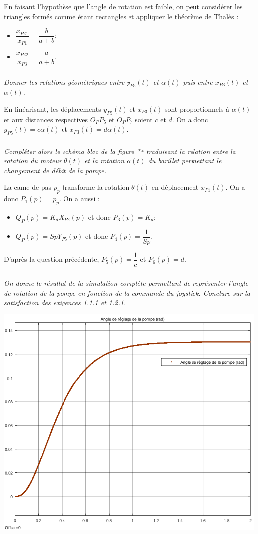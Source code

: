 \documentclass[10pt,fleqn]{article} %
\begin{document}
\begin{multicols}{2}
\begin{corrige}
En faisant l'hypothèse que l'angle de rotation est faible, on peut considérer les triangles formés comme étant rectangles et appliquer le théorème de Thalès :
\begin{itemize}
\item $\dfrac{x_{P21}}{x_{P1}}=\dfrac{b}{a+b}$;
\item $\dfrac{x_{P22}}{x_{P3}}=\dfrac{a}{a+b}$.
\end{itemize}
\end{corrige}
\else
\fi

\subparagraph{}
\textit{Donner les relations géométriques entre $y_{P5}(t)$ et $\alpha(t)$ puis entre $x_{P3}(t)$ et $\alpha(t)$.}
\ifprof
\begin{corrige}
En linéarisant, les déplacements $y_{P5}(t)$ et $x_{P3}(t)$ sont proportionnels à $\alpha(t)$ et aux distances respectives $O_PP_5$ et $O_PP_7$ soient $c$ et $d$. 
On a donc $y_{P5}(t)=c\alpha(t)$ et $x_{P3}(t)=d \alpha(t)$.

\end{corrige}
\else 
\fi
\subparagraph{}
\textit{Compléter alors le schéma bloc de la figure ** traduisant la relation entre la rotation du moteur $\theta(t)$ et la rotation $\alpha(t)$ du barillet permettant le changement de débit de la pompe.}
\ifprof


\begin{corrige}
La came de pas $p_p$ transforme la rotation $\theta(t)$ en déplacement $x_{P1}(t)$. 
On a donc $P_1(p)=p_p$.
On a aussi :
\begin{itemize}
\item $Q_P(p) = K_d X_{P2}(p)$ et donc $P_3(p)=K_d$;
\item $Q_{P}(p) = Sp Y_{P5}(p)$ et donc $P_4(p)=\dfrac{1}{Sp}$.
\end{itemize}
D'après la question précédente, $P_5(p)=\dfrac{1}{c}$ et $P_6(p)=d$.
\end{corrige}
\else
\fi

\subparagraph{}
\textit{On donne le résultat de la simulation complète permettant de représenter l'angle de rotation de la pompe en fonction de la commande du joystick. Conclure sur la satisfaction des exigences 1.1.1 et 1.2.1.}

\begin{center}
\includegraphics[width=.45\textwidth]{images/simu_2}
\end{center}
\ifprof


\end{multicols}
\end{document}
